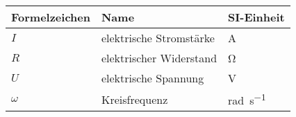 \begin{table}[htbp]
    \centering
        \begin{tabular}{lll}
            \toprule
            Formelzeichen   & Name                              & SI-Einheit \\
            \midrule
            $I$             & elektrische Stromstärke           & \si{\ampere} \\
            $R$             & elektrischer Widerstand           & \si{\ohm} \\
            $U$             & elektrische Spannung              & \si{\volt} \\
            $\omega$        & Kreisfrequenz                     & \si{\radian\per\second} \\
            \bottomrule
        \end{tabular}
\end{table}